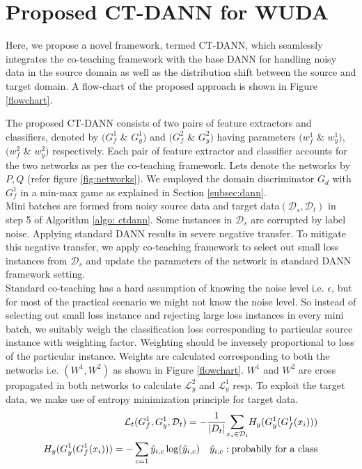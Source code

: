 
\section{Proposed CT-DANN for WUDA}
Here, we propose a novel framework, termed CT-DANN, which seamlessly integrates the co-teaching framework with the base DANN for handling noisy data in the source domain as well as the distribution shift between the source and target domain.
A flow-chart of the proposed approach is shown in Figure \ref{flowchart}.

\vspace{-1cm}

The proposed CT-DANN consists of two pairs of feature extractors and classifiers, denoted by $(G_{f}^1$ \& $G_{y}^1)$ and $(G_{f}^2$ \& $G_{y}^2)$ having parameters $(w_{f}^1$ \& $w_{y}^1)$, $(w_{f}^2$ \& $w_{y}^2)$ respectively. 
Each pair of feature extractor and classifier accounts for the two networks as per the co-teaching framework. Lets denote the networks by $P, Q$ (refer figure \ref{fig:networks}). We employed the domain discriminator $G_d$ with $G_{f}^1$ in a min-max game as explained in Section \ref{subsec:dann}.\\

Mini batches are formed from noisy source data and target data$(\mathcal{D}_s, \mathcal{D}_t)$ in step 5 of Algorithm \ref{algo: ctdann}. Some instances in $\mathcal{D}_s$ are corrupted by label noise. Applying standard DANN results in severe negative transfer. To mitigate this negative transfer, we apply co-teaching framework to select out small loss instances from $\mathcal{D}_s$ and update the parameters of the network in standard DANN framework setting.\\

Standard co-teaching has a hard assumption of knowing the noise level i.e. $\epsilon$, but for most of the practical scenario we might not know the noise level. So instead of selecting out small loss instance and rejecting large loss instances in every mini batch, we suitably weigh the classification loss corresponding to particular source instance with weighting factor. Weighting should be inversely proportional to loss of the particular instance. Weights are calculated corresponding to both the networks i.e. $(W^1, W^2)$ as shown in Figure \ref{flowchart}. $W^1$ and $W^2$ are cross propagated in both networks to calculate $\mathcal{L}_{y}^2$ and $\mathcal{L}_{y}^1$ resp. To exploit the target data, we make use of entropy minimization principle for target data.
\begin{equation}
\begin{align}
    \mathcal{L}_t(G_{f}^1, G_{y}^1, \mathcal{D}_t) = - \dfrac{1}{|D_t|} \mathlarger\sum\limits_{x_i \in \mathcal{D}_t} H_y(G_{y}^1(G_{f}^1(x_i)))\\
    H_y(G_{y}^1(G_{f}^1(x_i))) = - \sum_{c=1} \hat{y}_{i,c} \log(\hat{y}_{i,c}) \quad  \hat{y}_{i,c}: \text{probabily for a class}
\end{align}
\end{equation}

